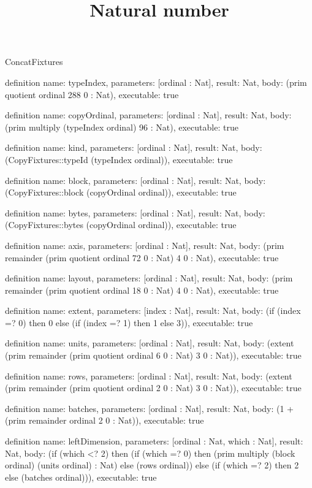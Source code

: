 \begin{lexlean}{ConcatFixtures}
\title{Natural number}
\begin{semanticmodule}
definition{
  name: typeIndex,
  parameters: [ordinal : Nat],
  result: Nat,
  body: (prim quotient ordinal 288 0 : Nat),
  executable: true
}

definition{
  name: copyOrdinal,
  parameters: [ordinal : Nat],
  result: Nat,
  body: (prim multiply (typeIndex ordinal) 96 : Nat),
  executable: true
}

definition{
  name: kind,
  parameters: [ordinal : Nat],
  result: Nat,
  body: (CopyFixtures::typeId (typeIndex ordinal)),
  executable: true
}

definition{
  name: block,
  parameters: [ordinal : Nat],
  result: Nat,
  body: (CopyFixtures::block (copyOrdinal ordinal)),
  executable: true
}

definition{
  name: bytes,
  parameters: [ordinal : Nat],
  result: Nat,
  body: (CopyFixtures::bytes (copyOrdinal ordinal)),
  executable: true
}

definition{
  name: axis,
  parameters: [ordinal : Nat],
  result: Nat,
  body: (prim remainder (prim quotient ordinal 72 0 : Nat) 4 0 : Nat),
  executable: true
}

definition{
  name: layout,
  parameters: [ordinal : Nat],
  result: Nat,
  body: (prim remainder (prim quotient ordinal 18 0 : Nat) 4 0 : Nat),
  executable: true
}

definition{
  name: extent,
  parameters: [index : Nat],
  result: Nat,
  body: (if (index =? 0) then 0 else (if (index =? 1) then 1 else 3)),
  executable: true
}

definition{
  name: units,
  parameters: [ordinal : Nat],
  result: Nat,
  body: (extent (prim remainder (prim quotient ordinal 6 0 : Nat) 3 0 : Nat)),
  executable: true
}

definition{
  name: rows,
  parameters: [ordinal : Nat],
  result: Nat,
  body: (extent (prim remainder (prim quotient ordinal 2 0 : Nat) 3 0 : Nat)),
  executable: true
}

definition{
  name: batches,
  parameters: [ordinal : Nat],
  result: Nat,
  body: (1 + (prim remainder ordinal 2 0 : Nat)),
  executable: true
}

definition{
  name: leftDimension,
  parameters: [ordinal : Nat, which : Nat],
  result: Nat,
  body: (if (which <? 2) then (if (which =? 0) then (prim multiply (block ordinal) (units ordinal) : Nat) else (rows ordinal)) else (if (which =? 2) then 2 else (batches ordinal))),
  executable: true
}


\end{semanticmodule}
\end{lexlean}
